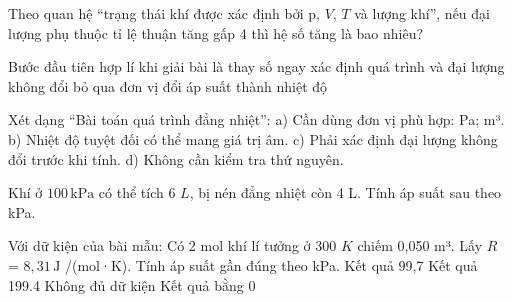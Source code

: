 \begin{ex}
Theo quan hệ “trạng thái khí được xác định bởi p, $V$, $T$ và lượng khí”, nếu đại lượng phụ thuộc tỉ lệ thuận tăng gấp 4 thì hệ số tăng là bao nhiêu?
\end{ex}

\begin{ex}
Bước đầu tiên hợp lí khi giải bài là
\choice
{thay số ngay}
{\True xác định quá trình và đại lượng không đổi}
{bỏ qua đơn vị}
{đổi áp suất thành nhiệt độ}
\end{ex}

\begin{ex}
Xét dạng “Bài toán quá trình đẳng nhiệt”: a) Cần dùng đơn vị phù hợp: Pa; m³. b) Nhiệt độ tuyệt đối có thể mang giá trị âm. c) Phải xác định đại lượng không đổi trước khi tính. d) Không cần kiểm tra thứ nguyên.
\choiceTF

\end{ex}

\begin{ex}
Khí ở $100\,\text{kPa}$ có thể tích 6 $L$, bị nén đẳng nhiệt còn 4 L. Tính áp suất sau theo kPa.
\end{ex}

\begin{ex}
Với dữ kiện của bài mẫu: Có 2 mol khí lí tưởng ở 300 $K$ chiếm 0,050 m³. Lấy $R$ = $8,31\,\text{J}$ /(mol·K). Tính áp suất gần đúng theo kPa.
\choice
{\True Kết quả 99,7}
{Kết quả 199.4}
{Không đủ dữ kiện}
{Kết quả bằng 0}
\end{ex}

